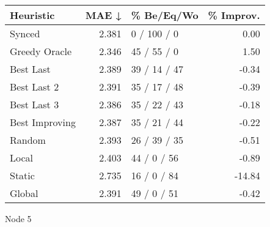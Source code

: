 \begin{tabular}{lrlr}
\toprule
\textbf{Heuristic} & \textbf{MAE ↓} & \textbf{\% Be/Eq/Wo} & \textbf{\% Improv.} \\
\midrule
            Synced &          2.381 &          0 / 100 / 0 &                0.00 \\
     Greedy Oracle &          2.346 &          45 / 55 / 0 &                1.50 \\
         Best Last &          2.389 &         39 / 14 / 47 &               -0.34 \\
       Best Last 2 &          2.391 &         35 / 17 / 48 &               -0.39 \\
       Best Last 3 &          2.386 &         35 / 22 / 43 &               -0.18 \\
    Best Improving &          2.387 &         35 / 21 / 44 &               -0.22 \\
            Random &          2.393 &         26 / 39 / 35 &               -0.51 \\
             Local &          2.403 &          44 / 0 / 56 &               -0.89 \\
            Static &          2.735 &          16 / 0 / 84 &              -14.84 \\
            Global &          2.391 &          49 / 0 / 51 &               -0.42 \\
\bottomrule
\end{tabular}
\caption{Node 5}
\label{tab:ds_iid_lr05_le1_bs4_5}
